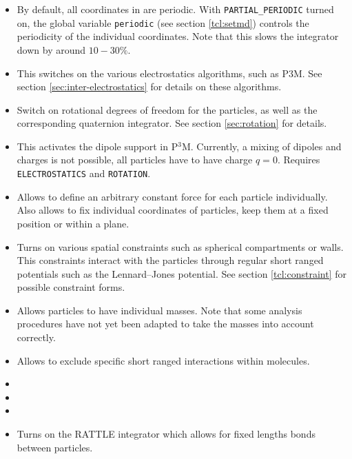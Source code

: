 \begin{itemize}
\item {} By default, all coordinates in \es{}
  are periodic. With \texttt{PARTIAL\_PERIODIC} turned on, the \es{}
  global variable \texttt{periodic} (see section \vref{tcl:setmd})
  controls the periodicity of the individual coordinates. Note that
  this slows the integrator down by around $10-30\%$.
\item {} This switches on the various
  electrostatics algorithms, such as P3M. See section
  \vref{sec:inter-electrostatics} for details on these algorithms.
\item {} Switch on rotational degrees of freedom for
  the particles, as well as the corresponding quaternion integrator.
  See section \vref{sec:rotation} for details.
\item {} This activates the dipole support in P$^3$M.
  Currently, a mixing of dipoles and charges is not possible, \ie all
  particles have to have charge $q=0$.  Requires
  \texttt{ELECTROSTATICS} and \texttt{ROTATION}.
\item {} Allows to define an arbitrary
  constant force for each particle individually. Also allows to fix
  individual coordinates of particles, \eg keep them at a fixed
  position or within a plane.
\item {} Turns on various spatial constraints such
  as spherical compartments or walls. This constraints interact with
  the particles through regular short ranged potentials such as the
  Lennard--Jones potential. See section \vref{tcl:constraint} for
  possible constraint forms.
\item {} Allows particles to have individual masses. Note
  that some analysis procedures have not yet been adapted to take the
  masses into account correctly.
\item {} Allows to exclude specific short ranged
  interactions within molecules.
\item {} 
\item {} 
\item {} 
\item {} Turns on the RATTLE integrator which
  allows for fixed lengths bonds between particles. 
\end{itemize}

